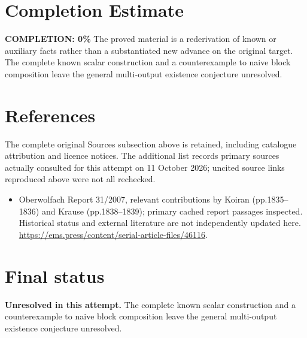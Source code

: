 \documentclass[11pt]{article}
\begin{document}
\section{Completion Estimate}
\noindent\textbf{COMPLETION: 0\%}
The proved material is a rederivation of known or auxiliary facts rather than a substantiated new advance on the original target. The complete known scalar construction and a counterexample to naive block composition leave the general multi-output existence conjecture unresolved.
\section{References}
The complete original Sources subsection above is retained, including catalogue attribution and licence notices. The additional list records primary sources actually consulted for this attempt on 11 October 2026; uncited source links reproduced above were not all rechecked.
\begin{itemize}
\item Oberwolfach Report 31/2007, relevant contributions by Koiran (pp.1835--1836) and Krause (pp.1838--1839); primary cached report passages inspected. Historical status and external literature are not independently updated here. \url{https://ems.press/content/serial-article-files/46116}.
\end{itemize}
\section{Final status}
\textbf{Unresolved in this attempt.} The complete known scalar construction and a counterexample to naive block composition leave the general multi-output existence conjecture unresolved.
\end{document}
